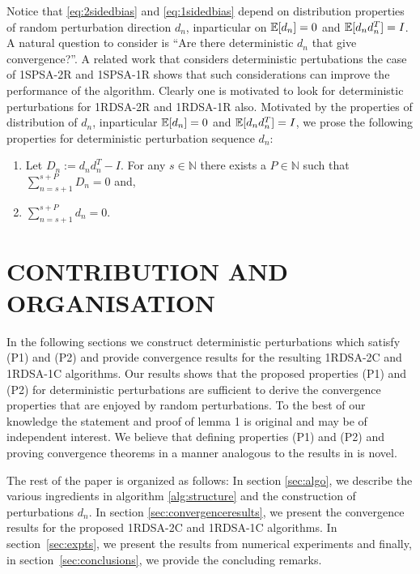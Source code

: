 \documentclass[letterpaper, 10 pt, conference]{ieeeconf}  %
\begin{document}
Notice that \eqref{eq:2sidedbias} and \eqref{eq:1sidedbias} depend on distribution properties of 
random perturbation direction $d_n$, inparticular on $\mathbb{E}[d_n]=0$ and $\mathbb{E}[d_nd_n^T]=I$. A natural question 
to consider is ``Are there deterministic $d_n$ that give convergence?''. 
A related work \cite{bhatnagar2003two} that considers deterministic pertubations the case of 1SPSA-2R and 1SPSA-1R shows that such considerations 
can improve the performance of the algorithm. Clearly one is motivated to look for deterministic 
perturbations for 1RDSA-2R and 1RDSA-1R also. 
Motivated by the properties of distribution of $d_n$, inparticular $\mathbb{E}[d_n]=0$ and $\mathbb{E}[d_nd_n^T]=I$,
we prose the following properties for deterministic perturbation sequence $d_n$:
\begin{enumerate}[label=\textbf{(P\arabic*)}]
  \item Let $D_n:=d_nd_n^T-I.$ For any $s \in \mathbb{N}$ there exists a 
  $P \in \mathbb{N}$ such that $\sum\limits_{n=s+1}^{s+P}D_n=0$ and,
  \item  $\sum\limits_{n=s+1}^{s+P}d_n=0.$
\end{enumerate}

\section{CONTRIBUTION AND ORGANISATION}
In the following sections we construct deterministic perturbations which satisfy (P1) and (P2)
and provide convergence results for the resulting 1RDSA-2C and 1RDSA-1C algorithms. 
Our results shows that the proposed properties (P1) and (P2) for deterministic perturbations 
are sufficient to derive the convergence properties that are enjoyed by random perturbations. 
To the best of our knowledge the statement and proof of lemma 1 is original and may be of independent
interest. We believe that defining properties (P1) and (P2) and proving convergence theorems in a 
manner analogous to the results in \cite{bhatnagar2003two} is novel.

The rest of the paper is organized as follows: In section \ref{sec:algo}, we
describe the various ingredients in algorithm \ref{alg:structure} and the construction
of perturbations $d_n$.
In section \ref{sec:convergenceresults}, 
we present the convergence results for the proposed 1RDSA-2C and 1RDSA-1C algorithms.
In section~\ref{sec:expts}, we present the results from numerical experiments and finally, 
in section~\ref{sec:conclusions}, we provide the concluding remarks.
\end{document}

